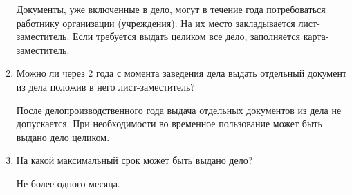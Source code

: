 \documentclass[a4paper,10pt]{article}
\theoremstyle{plain} %
\theoremstyle{definition} %
\theoremstyle{remark} %
\begin{document}
\begin{enumerate}
	Документы, уже включенные в дело, могут в течение года потребоваться
	работнику организации (учреждения). На их место закладывается лист-заместитель.
	Если требуется выдать целиком все дело, заполняется карта-заместитель.

	\item Можно ли через 2 года с момента заведения дела выдать отдельный документ из дела положив в него лист-заместитель?
	
	После делопроизводственного года выдача отдельных документов из дела
	не допускается. При необходимости во временное пользование может быть выдано дело целиком.

	\item На какой максимальный срок может быть выдано дело?
	
	Не более одного месяца.

\end{enumerate}
\end{document}
